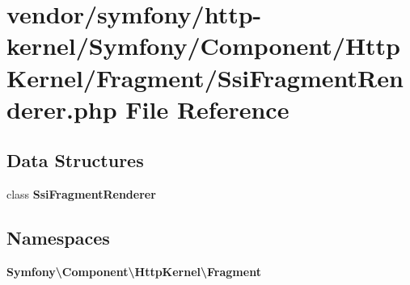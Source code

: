 \section{vendor/symfony/http-\/kernel/\+Symfony/\+Component/\+Http\+Kernel/\+Fragment/\+Ssi\+Fragment\+Renderer.php File Reference}
\label{_ssi_fragment_renderer_8php}
\subsection*{Data Structures}
\begin{DoxyCompactItemize}
\item 
class {\bf Ssi\+Fragment\+Renderer}
\end{DoxyCompactItemize}
\subsection*{Namespaces}
\begin{DoxyCompactItemize}
\item 
 {\bf Symfony\textbackslash{}\+Component\textbackslash{}\+Http\+Kernel\textbackslash{}\+Fragment}
\end{DoxyCompactItemize}
